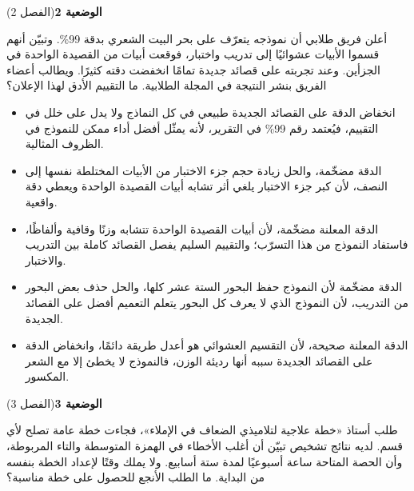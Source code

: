 \documentclass[11pt,a4paper]{article}
\begin{document}
\par\vspace{6pt}
\noindent
{\large\khatt\textbf{الوضعية 2}}\hfill{\small(الفصل 2)}\par\nopagebreak\vspace{3pt}
\setlength{\fboxsep}{7pt}\colorbox{gray!10}{\parbox{\dimexpr\linewidth-14pt}{أعلن فريق طلابي أن نموذجه يتعرّف على بحر البيت الشعري بدقة 99\%. وتبيّن أنهم قسموا الأبيات عشوائيًا إلى تدريب واختبار، فوقعت أبيات من القصيدة الواحدة في الجزأين. وعند تجربته على قصائد جديدة تمامًا انخفضت دقته كثيرًا. ويطالب أعضاء الفريق بنشر النتيجة في المجلة الطلابية. ما التقييم الأدق لهذا الإعلان؟}}\par\nopagebreak
\begin{itemize}[leftmargin=1.0cm, labelsep=6pt, itemsep=3pt, topsep=4pt, parsep=0pt]
  \item[\textbf{أ)}] انخفاض الدقة على القصائد الجديدة طبيعي في كل النماذج ولا يدل على خلل في التقييم، فيُعتمد رقم 99\% في التقرير، لأنه يمثّل أفضل أداء ممكن للنموذج في الظروف المثالية.
  \item[\textbf{ب)}] الدقة مضخّمة، والحل زيادة حجم جزء الاختبار من الأبيات المختلطة نفسها إلى النصف، لأن كبر جزء الاختبار يلغي أثر تشابه أبيات القصيدة الواحدة ويعطي دقة واقعية.
  \item[\textbf{ج)}] الدقة المعلنة مضخّمة، لأن أبيات القصيدة الواحدة تتشابه وزنًا وقافية وألفاظًا، فاستفاد النموذج من هذا التسرّب؛ والتقييم السليم يفصل القصائد كاملة بين التدريب والاختبار.
  \item[\textbf{د)}] الدقة مضخّمة لأن النموذج حفظ البحور الستة عشر كلها، والحل حذف بعض البحور من التدريب، لأن النموذج الذي لا يعرف كل البحور يتعلم التعميم أفضل على القصائد الجديدة.
  \item[\textbf{هـ)}] الدقة المعلنة صحيحة، لأن التقسيم العشوائي هو أعدل طريقة دائمًا، وانخفاض الدقة على القصائد الجديدة سببه أنها رديئة الوزن، فالنموذج لا يخطئ إلا مع الشعر المكسور.
\end{itemize}
\par\vspace{6pt}
\noindent
{\large\khatt\textbf{الوضعية 3}}\hfill{\small(الفصل 3)}\par\nopagebreak\vspace{3pt}
\setlength{\fboxsep}{7pt}\colorbox{gray!10}{\parbox{\dimexpr\linewidth-14pt}{طلب أستاذ «خطة علاجية لتلاميذي الضعاف في الإملاء»، فجاءت خطة عامة تصلح لأي قسم. لديه نتائج تشخيص تبيّن أن أغلب الأخطاء في الهمزة المتوسطة والتاء المربوطة، وأن الحصة المتاحة ساعة أسبوعيًا لمدة ستة أسابيع. ولا يملك وقتًا لإعداد الخطة بنفسه من البداية. ما الطلب الأنجع للحصول على خطة مناسبة؟}}\par\nopagebreak
\end{document}
